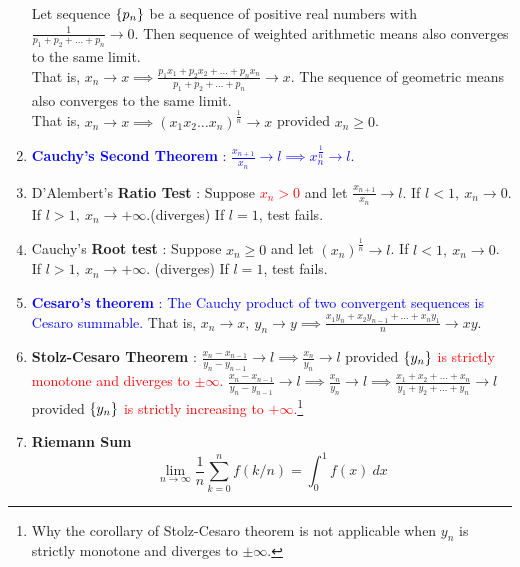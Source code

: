 \begin{enumerate}
		\subitem Let sequence $\{p_n\}$ be a sequence of positive real numbers with $\frac{1}{p_1+p_2+\dots+p_n} \to 0$. Then sequence of weighted arithmetic means also converges to the same limit.\\ That is, $x_n \to x \implies \frac{p_1x_1 + p_2x_2 + \dots + p_nx_n}{p_1+p_2+\dots+p_n} \to x$.
		\subitem The sequence of geometric means also converges to the same limit.\\ That is, $x_n \to x \implies (x_1x_2\dots x_n)^\frac{1}{n} \to x$ provided $x_n \ge 0$.
	\item \textcolor{blue}{\textbf{Cauchy's Second Theorem} : $ \frac{x_{n+1}}{x_n} \to l \implies x_n^\frac{1}{n} \to l$.}
	\item D'Alembert's \textbf{Ratio Test} : Suppose \textcolor{red}{$x_n > 0$} and let $\frac{x_{n+1}}{x_n} \to l$.
		\subitem If $l < 1,\ x_n \to 0$.
		\subitem If $l > 1,\ x_n \to +\infty$.(diverges)
		\subitem If $l = 1$, test fails.
	\item Cauchy's \textbf{Root test} : Suppose $x_n \ge 0$ and let $ (x_n)^{\frac{1}{n}} \to l$.
		\subitem If $l < 1,\ x_n \to 0$.
		\subitem If $l > 1,\ x_n \to +\infty$. (diverges)
		\subitem If $l = 1$, test fails.
	\item \textcolor{blue}{\textbf{Cesaro's theorem} : The Cauchy product of two convergent sequences is Cesaro summable.} That is, $x_n \to x,\ y_n \to y \implies \frac{x_1y_n + x_2y_{n-1} + \dots + x_ny_1}{n} \to xy$.
	\item \textbf{Stolz-Cesaro Theorem} : $\frac{x_n-x_{n-1}}{y_n-y_{n-1}} \to l \implies \frac{x_n}{y_n} \to l$ provided \textcolor{red}{$\{y_n\}$ is strictly monotone and diverges to $\pm \infty$.}
		\subitem $\frac{x_n-x_{n-1}}{y_n-y_{n-1}} \to l \implies \frac{x_n}{y_n} \to l \implies \frac{x_1+x_2+\dots+x_n}{y_1+y_2+\dots+y_n} \to l$ provided \textcolor{red}{$\{y_n\}$ is strictly increasing to $+\infty$.}\footnote{Why the corollary of Stolz-Cesaro theorem is not applicable when $y_n$ is strictly monotone and diverges to $\pm \infty$.}
	\item \textbf{Riemann Sum}
		\[ \lim_{n \to \infty} \frac{1}{n} \sum_{k=0}^n f(k/n) = \int_0^1 f(x)\ dx \]
\end{enumerate}

